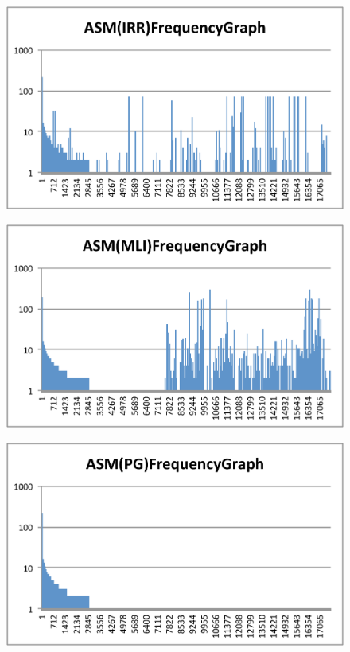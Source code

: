 \documentclass[conference]{IEEEtran}
\begin{document}
\begin{figure}[bt]
\begin{minipage}[b]{0.48\linewidth}
    \label{fig:asm-5gram-DR-histogram}%
  \end{minipage}
  \begin{minipage}[b]{0.48\linewidth}
    \includegraphics[clip,width=1.0\columnwidth]{images/IRR}%
    \label{fig:asm-5gram-IRR-histogram}%
  \end{minipage}\vspace{0.5cm}
  \begin{minipage}[b]{0.48\linewidth}
    \includegraphics[clip,width=1.0\columnwidth]{images/MLI}%
    \label{fig:asm-5gram-MLI-histogram}%
  \end{minipage}
  \begin{minipage}[b]{0.48\linewidth}
    \includegraphics[clip,width=1.0\columnwidth]{images/PG}%

\end{minipage}
\end{figure}
\end{document}
